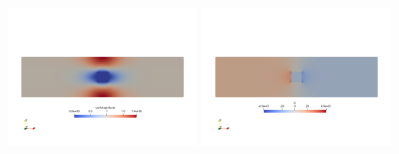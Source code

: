 \begin{center}
\includegraphics[width=5cm]{python_codes/fieldstone_78/results/exp10/vel}
\includegraphics[width=5cm]{python_codes/fieldstone_78/results/exp10/p}
\end{center}

